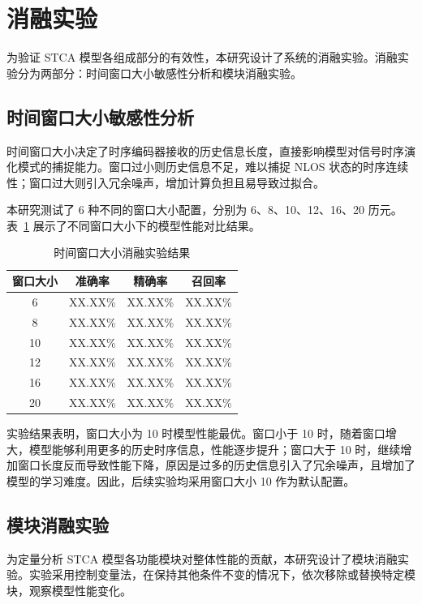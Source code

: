 \section{消融实验}

为验证 STCA 模型各组成部分的有效性，本研究设计了系统的消融实验。消融实验分为两部分：时间窗口大小敏感性分析和模块消融实验。

\subsection{时间窗口大小敏感性分析}

时间窗口大小决定了时序编码器接收的历史信息长度，直接影响模型对信号时序演化模式的捕捉能力。窗口过小则历史信息不足，难以捕捉 NLOS 状态的时序连续性；窗口过大则引入冗余噪声，增加计算负担且易导致过拟合。

本研究测试了 6 种不同的窗口大小配置，分别为 6、8、10、12、16、20 历元。表~\ref{tab:ablation_window} 展示了不同窗口大小下的模型性能对比结果。

\begin{table}[h]
\centering
\caption{时间窗口大小消融实验结果}
\label{tab:ablation_window}
\begin{tabular}{cccc}
\hline
窗口大小 & 准确率 & 精确率 & 召回率 \\
\hline
6 & XX.XX\% & XX.XX\% & XX.XX\% \\
8 & XX.XX\% & XX.XX\% & XX.XX\% \\
10 & XX.XX\% & XX.XX\% & XX.XX\% \\
12 & XX.XX\% & XX.XX\% & XX.XX\% \\
16 & XX.XX\% & XX.XX\% & XX.XX\% \\
20 & XX.XX\% & XX.XX\% & XX.XX\% \\
\hline
\end{tabular}
\end{table}

实验结果表明，窗口大小为 10 时模型性能最优。窗口小于 10 时，随着窗口增大，模型能够利用更多的历史时序信息，性能逐步提升；窗口大于 10 时，继续增加窗口长度反而导致性能下降，原因是过多的历史信息引入了冗余噪声，且增加了模型的学习难度。因此，后续实验均采用窗口大小 10 作为默认配置。

\subsection{模块消融实验}

为定量分析 STCA 模型各功能模块对整体性能的贡献，本研究设计了模块消融实验。实验采用控制变量法，在保持其他条件不变的情况下，依次移除或替换特定模块，观察模型性能变化。

